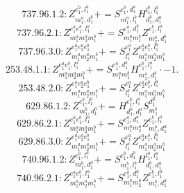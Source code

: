 \documentclass[letterpaper,10pt,fleqn,leqno,onecolumn]{article}
\begin{document}
\begin{equation} \;\;\;\;\;\;  737.96.1.2: Z^{e_{1}^{b},l_{1}^{a}}_{m_{1}^{a},d_{1}^{b}}+=S^{e_{1}^{b},d_{1}^{a}}_{m_{1}^{a},l_{1}^{b}}H^{l_{1}^{b},l_{1}^{a}}_{d_{1}^{b},d_{1}^{a}} \end{equation}
\begin{equation} \;\;\;\;\;\;  737.96.2.1: Z^{e_{1}^{a}e_{1}^{b},l_{1}^{a}}_{m_{1}^{a}m_{2}^{a}m_{1}^{b}}+=S^{e_{1}^{a},d_{1}^{b}}_{m_{1}^{a}m_{1}^{b}}Z^{e_{1}^{b},l_{1}^{a}}_{m_{2}^{a},d_{1}^{b}} \end{equation}
\begin{equation} \;\;\;\;\;\;  737.96.3.0: Z^{e_{1}^{a}e_{2}^{a}e_{1}^{b}}_{m_{1}^{a}m_{2}^{a}m_{1}^{b}}+=S^{e_{1}^{a}}_{l_{1}^{a}}Z^{e_{2}^{a}e_{1}^{b},l_{1}^{a}}_{m_{1}^{a}m_{2}^{a}m_{1}^{b}} \end{equation}
\begin{equation} \;\;\;\;\;\;  253.48.1.1: Z^{e_{1}^{a}e_{1}^{b},l_{1}^{a}}_{m_{1}^{a}m_{2}^{a}m_{1}^{b}}+=S^{e_{1}^{a},d_{1}^{b}}_{m_{1}^{a}m_{1}^{b}}H^{e_{1}^{b},l_{1}^{a}}_{m_{2}^{a},d_{1}^{b}}\cdot -1. \end{equation}
\begin{equation} \;\;\;\;\;\;  253.48.2.0: Z^{e_{1}^{a}e_{2}^{a}e_{1}^{b}}_{m_{1}^{a}m_{2}^{a}m_{1}^{b}}+=S^{e_{1}^{a}}_{l_{1}^{a}}Z^{e_{2}^{a}e_{1}^{b},l_{1}^{a}}_{m_{1}^{a}m_{2}^{a}m_{1}^{b}} \end{equation}
\begin{equation} \;\;\;\;\;\;  629.86.1.2: Z^{e_{1}^{b},l_{1}^{a}}_{m_{1}^{b},d_{1}^{a}}+=H^{e_{1}^{b},l_{1}^{a}}_{d_{1}^{b},d_{1}^{a}}S^{d_{1}^{b}}_{m_{1}^{b}} \end{equation}
\begin{equation} \;\;\;\;\;\;  629.86.2.1: Z^{e_{1}^{a}e_{1}^{b},l_{1}^{a}}_{m_{1}^{a}m_{2}^{a}m_{1}^{b}}+=S^{e_{1}^{a},d_{1}^{a}}_{m_{1}^{a}m_{2}^{a}}Z^{e_{1}^{b},l_{1}^{a}}_{m_{1}^{b},d_{1}^{a}} \end{equation}
\begin{equation} \;\;\;\;\;\;  629.86.3.0: Z^{e_{1}^{a}e_{2}^{a}e_{1}^{b}}_{m_{1}^{a}m_{2}^{a}m_{1}^{b}}+=S^{e_{1}^{a}}_{l_{1}^{a}}Z^{e_{2}^{a}e_{1}^{b},l_{1}^{a}}_{m_{1}^{a}m_{2}^{a}m_{1}^{b}} \end{equation}
\begin{equation} \;\;\;\;\;\;  740.96.1.2: Z^{e_{1}^{b},l_{1}^{a}}_{m_{1}^{b},d_{1}^{a}}+=S^{e_{1}^{b},d_{1}^{b}}_{m_{1}^{b},l_{1}^{b}}H^{l_{1}^{b},l_{1}^{a}}_{d_{1}^{b},d_{1}^{a}} \end{equation}
\begin{equation} \;\;\;\;\;\;  740.96.2.1: Z^{e_{1}^{a}e_{1}^{b},l_{1}^{a}}_{m_{1}^{a}m_{2}^{a}m_{1}^{b}}+=S^{e_{1}^{a},d_{1}^{a}}_{m_{1}^{a}m_{2}^{a}}Z^{e_{1}^{b},l_{1}^{a}}_{m_{1}^{b},d_{1}^{a}} \end{equation}
\end{document}
